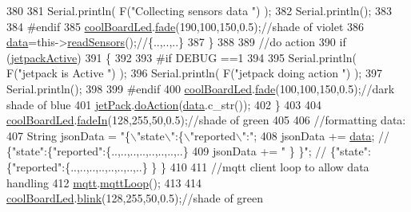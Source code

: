 \begin{DoxyCode}
380 
381         Serial.println( F(\textcolor{stringliteral}{"Collecting sensors data "}) );
382         Serial.println();
383     
384 \textcolor{preprocessor}{    #endif}
385         \hyperlink{classCoolBoard_a1b1d3c684a5baa56b08486e192fd8e97}{coolBoardLed}.\hyperlink{classCoolBoardLed_af1cacbaa88db8bcf6042c1083ba41155}{fade}(190,100,150,0.5);\textcolor{comment}{//shade of violet        }
386         \hyperlink{classCoolBoard_a427fb753dd8575bdf821c70a5c63d695}{data}=this->\hyperlink{classCoolBoard_ad03abdce2e65f520bbf2cff0f2d083cf}{readSensors}();\textcolor{comment}{//\{..,..,..\}}
387     \}
388     
389     \textcolor{comment}{//do action}
390     \textcolor{keywordflow}{if} (\hyperlink{classCoolBoard_a9be03a913d26e558328935ca3b59a75e}{jetpackActive})
391     \{
392     
393 \textcolor{preprocessor}{    #if DEBUG ==1}
394 
395         Serial.println( F(\textcolor{stringliteral}{"jetpack is Active "}) );
396         Serial.println( F(\textcolor{stringliteral}{"jetpack doing action "}) );
397         Serial.println();
398 
399 \textcolor{preprocessor}{    #endif}
400         \hyperlink{classCoolBoard_a1b1d3c684a5baa56b08486e192fd8e97}{coolBoardLed}.\hyperlink{classCoolBoardLed_af1cacbaa88db8bcf6042c1083ba41155}{fade}(100,100,150,0.5);\textcolor{comment}{//dark shade of blue     }
401         \hyperlink{classCoolBoard_a30b1357881b01ccbec676856a91e48e9}{jetPack}.\hyperlink{classJetpack_a9e703197093094b963f9ad57817495b8}{doAction}(\hyperlink{classCoolBoard_a427fb753dd8575bdf821c70a5c63d695}{data}.c\_str());
402     \}
403     
404     \hyperlink{classCoolBoard_a1b1d3c684a5baa56b08486e192fd8e97}{coolBoardLed}.\hyperlink{classCoolBoardLed_ab778f5e7bed0ab74e3906d82110493c3}{fadeIn}(128,255,50,0.5);\textcolor{comment}{//shade of green}
405 
406     \textcolor{comment}{//formatting data:}
407     String jsonData = \textcolor{stringliteral}{"\{\(\backslash\)"state\(\backslash\)":\{\(\backslash\)"reported\(\backslash\)":"};
408     jsonData += \hyperlink{classCoolBoard_a427fb753dd8575bdf821c70a5c63d695}{data}; \textcolor{comment}{// \{"state":\{"reported":\{..,..,..,..,..,..,..,..\}}
409     jsonData += \textcolor{stringliteral}{" \} \}"}; \textcolor{comment}{// \{"state":\{"reported":\{..,..,..,..,..,..,..,..\}  \} \}}
410     
411     \textcolor{comment}{//mqtt client loop to allow data handling}
412     \hyperlink{classCoolBoard_a2399f44d7c23c1149a335cb3b46d90f1}{mqtt}.\hyperlink{classCoolMQTT_aa5eaae967b562b62cbcf2b8d81f6e5d5}{mqttLoop}();
413 
414     \hyperlink{classCoolBoard_a1b1d3c684a5baa56b08486e192fd8e97}{coolBoardLed}.\hyperlink{classCoolBoardLed_a96e1ea13003eee34c9dbcef340404426}{blink}(128,255,50,0.5);\textcolor{comment}{//shade of green    }

\end{DoxyCode}
